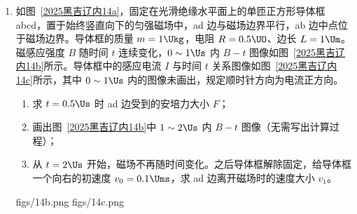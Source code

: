 \documentclass[\gkver]{gaokaozhenti}
\begin{document}
\begin{enumerate}


\item
如图~\ref{2025黑吉辽内14a}，固定在光滑绝缘水平面上的单匝正方形导体框 abcd，置于始终竖直向下的匀强磁场中，ad 边与磁场边界平行，ab 边中点位于磁场边界。导体框的质量 $m = 1 \Ukg$，电阻 $R = 0.5 \UO$、边长 $L = 1 \Um$。磁感应强度 $B$ 随时间 $t$ 连续变化，$0\sim1 \Us$ 内 $B-t$ 图像如图~\ref{2025黑吉辽内14b}所示。导体框中的感应电流 $I$ 与时间 $t$ 关系图像如图~\ref{2025黑吉辽内14c}所示，其中 $0\sim1 \Us$ 内的图像未画出，规定顺时针方向为电流正方向。
\begin{enumerate}
\item
求 $t = 0.5 \Us$ 时 ad 边受到的安培力大小 $F$；
\item
画出图~\ref{2025黑吉辽内14b}中 $1\sim2 \Us$ 内 $B-t$ 图像（无需写出计算过程）；
\item
从 $t = 2 \Us$ 开始，磁场不再随时间变化。之后导体框解除固定，给导体框一个向右的初速度 $v_{0} = 0.1 \Ums$，求 ad 边离开磁场时的速度大小 $v_{1}$。
\end{enumerate}

{figs/14b.png}
{figs/14c.png}


\end{enumerate}
\end{document}
